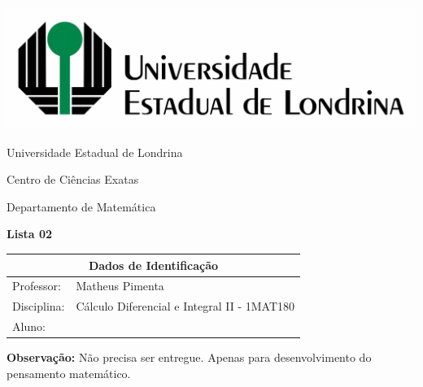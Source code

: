 \documentclass[oneside,a4paper,12pt]{article}
\newcommand{\universidade}{Universidade Estadual de Londrina}
\newcommand{\centro}{Centro de Ciências Exatas}
\newcommand{\departamento}{Departamento de Matemática}
\newcommand{\curso}{Ciência da Computação}
\newcommand{\professores}{Matheus Pimenta}
\newcommand{\disciplina}{Cálculo Diferencial e Integral II - 1MAT180}
\begin{document}
	\pagestyle{empty}
	
	\begin{center}
		\includegraphics[width=\linewidth/2]{logo.jpg}%
	 	\vspace{2pt} 	
		
		\universidade
		\par
		\centro
		\par
		\departamento
		\par
		\par
		\vspace{12pt}
		\LARGE \textbf{Lista 02}
		
	\end{center}
	
	\vspace{12pt}
	
	\begin{tabular}{ |l|p{12cm}| }
		
		\hline
		\multicolumn{2}{|c|}{\textbf{Dados de Identificação}} \\
		\hline
		Professor:         &    \professores           \\
		\hline
		Disciplina:        &    \disciplina          \\
		\hline
		Aluno:             &                   \\
		\hline
		
	\end{tabular}
	\vspace{6pt}
	
	{\bf Observação:} Não precisa ser entregue. Apenas para desenvolvimento do pensamento matemático.
	
	\begin{snugshade}
	\end{snugshade}
\end{document}
